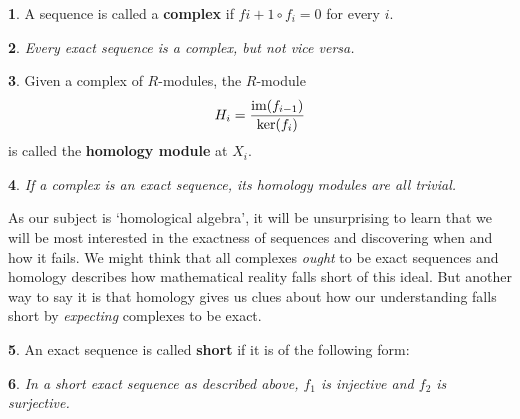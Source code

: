 \documentclass[oneside,english]{amsbook}
\numberwithin{section}{chapter}
\theoremstyle{plain}
\newtheorem{thm}{\protect\theoremname}
\theoremstyle{definition}
\newtheorem{defn}[thm]{\protect\definitionname}
\providecommand{\definitionname}{Definition}
\providecommand{\theoremname}{Theorem}
\newcommand{\im}{\text{\upshape{im}}}
\begin{document}
		\begin{defn}
			A sequence is called a \textbf{complex} if $f{i+1}\circ f_i = 0$ for every $i$.
		\end{defn}
		
		\begin{thm}
			Every exact sequence is a complex, but not \textit{vice versa}.
		\end{thm}
		
		\begin{defn}
			Given a complex of $R$-modules, the $R$-module
			\[
				H_i = \frac{\im(f_{i-1})}{\ker(f_{i})}
			\]
			is called the \textbf{homology module} at $X_i$.
		\end{defn}
		
		\begin{thm}
			If a complex is an exact sequence, its homology modules are all trivial.
		\end{thm}
		
		As our subject is `homological algebra', it will be unsurprising to learn that we will be most interested in the exactness of sequences and discovering when and how it fails. We might think that all complexes \textit{ought} to be exact sequences and homology describes how mathematical reality falls short of this ideal. But another way to say it is that homology gives us clues about how our understanding falls short by \textit{expecting} complexes to be exact.
		
		\begin{defn}
			An exact sequence is called \textbf{short} if it is of the following form:
			\begin{center}
			\end{center}					
		\end{defn}
		
		\begin{thm}
			In a short exact sequence as described above, $f_1$ is injective and $f_{2}$ is surjective.

			\begin{center}
			\end{center}
			
		\end{thm}
		
\end{document}
